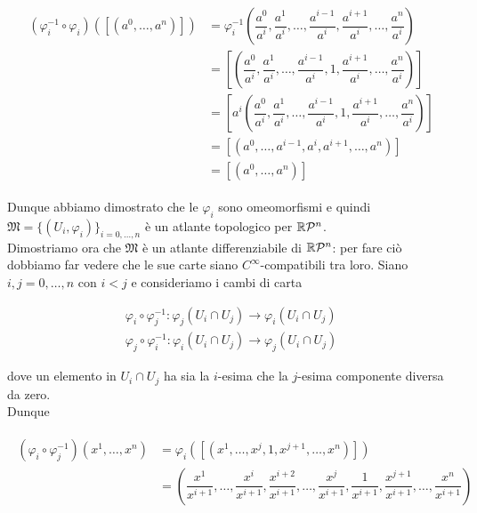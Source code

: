 \begin{align}
	\begin{split}
		(\varphi^{-1}_{i} \circ \varphi_{i})([(a^{0},\dots,a^{n})]) &= \varphi_{i}^{-1} \left( \dfrac{a^{0}}{a^{i}}, \dfrac{a^{1}}{a^{i}}, \dots, \dfrac{a^{i-1}}{a^{i}}, \dfrac{a^{i+1}}{a^{i}}, \dots, \dfrac{a^{n}}{a^{i}} \right) \\
		&= \left[ \left( \dfrac{a^{0}}{a^{i}}, \dfrac{a^{1}}{a^{i}}, \dots, \dfrac{a^{i-1}}{a^{i}}, 1, \dfrac{a^{i+1}}{a^{i}}, \dots, \dfrac{a^{n}}{a^{i}} \right) \right] \\
		&= \left[ a^{i}\left( \dfrac{a^{0}}{a^{i}}, \dfrac{a^{1}}{a^{i}}, \dots, \dfrac{a^{i-1}}{a^{i}}, 1, \dfrac{a^{i+1}}{a^{i}}, \dots, \dfrac{a^{n}}{a^{i}} \right) \right] \\
		&= [(a^{0},\dots,a^{i-1},a^{i},a^{i+1},\dots,a^{n})] \\
		&= [(a^{0},\dots,a^{n})]
	\end{split}
\end{align}

Dunque abbiamo dimostrato che le $ \varphi_{i} $ sono omeomorfismi e quindi $ \mathfrak{M} = \{(U_{i},\varphi_{i})\}_{i=0,\dots,n} $ è un atlante topologico per $ \mathbb{R}\mathcal{P}^{n} $. \\
Dimostriamo ora che $ \mathfrak{M} $ è un atlante differenziabile di $ \mathbb{R}\mathcal{P}^{n} $: per fare ciò dobbiamo far vedere che le sue carte siano $ C^{\infty} $-compatibili tra loro. Siano $ i,j=0,\dots,n $ con $ i<j $ e consideriamo i cambi di carta

\begin{gather}
	\varphi_{i} \circ \varphi_{j}^{-1} : \varphi_{j}(U_{i} \cap U_{j}) \to \varphi_{i}(U_{i} \cap U_{j}) \\
	\varphi_{j} \circ \varphi_{i}^{-1} : \varphi_{i}(U_{i} \cap U_{j}) \to \varphi_{j}(U_{i} \cap U_{j})
\end{gather}

dove un elemento in $ U_{i} \cap U_{j} $ ha sia la $ i $-esima che la $ j $-esima componente diversa da zero. \\
Dunque

\begin{align}
	\begin{split}
		(\varphi_{i} \circ \varphi_{j}^{-1})(x^{1},\dots,x^{n}) &= \varphi_{i}([(x^{1},\dots,x^{j},1,x^{j+1},\dots,x^{n})]) \\
		&= \left( \dfrac{x^{1}}{x^{i+1}}, \dots, \dfrac{x^{i}}{x^{i+1}}, \dfrac{x^{i+2}}{x^{i+1}}, \dots, \dfrac{x^{j}}{x^{i+1}}, \dfrac{1}{x^{i+1}}, \dfrac{x^{j+1}}{x^{i+1}}, \dots, \dfrac{x^{n}}{x^{i+1}} \right)
	\end{split}
\end{align}

